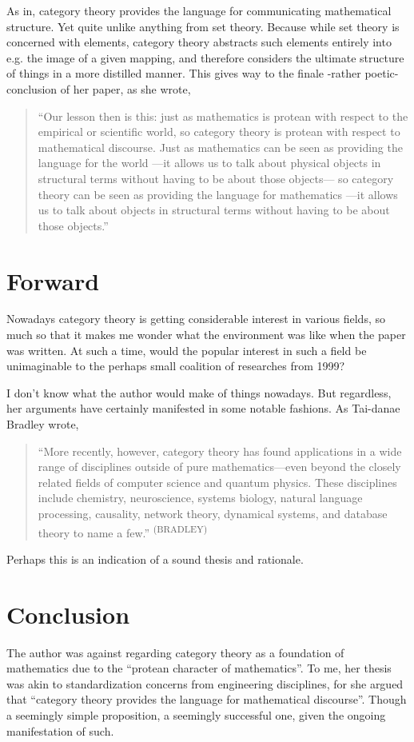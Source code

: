 As in, category theory provides the language for communicating mathematical structure. Yet quite unlike anything from set theory. Because while set theory is concerned with elements, category theory abstracts such elements entirely into e.g. the image of a given mapping, and therefore considers the ultimate structure of things in a more distilled manner. This gives way to the finale -rather poetic- conclusion of her paper, as she wrote,
\begin{quotation}
``Our lesson then is this: just as mathematics is protean with respect to the empirical or scientific world, so category theory is protean with respect to mathematical discourse. Just as mathematics can be seen as providing the language for the world —it allows us to talk about physical objects in structural terms without having to be about those objects— so category theory can be seen as providing the language for mathematics —it allows us to talk about objects in structural terms without having to be about those objects.''
\end{quotation}

\section*{Forward}

Nowadays category theory is getting considerable interest in various fields, so much so that it makes me wonder what the environment was like when the paper was written. At such a time, would the popular interest in such a field be unimaginable to the perhaps small coalition of researches from 1999?

I don’t know what the author would make of things nowadays. But regardless, her arguments have certainly manifested in some notable fashions. As Tai-danae Bradley wrote,
\begin{quotation}
``More recently, however, category theory has found applications in a wide range of disciplines outside of pure mathematics—even beyond the closely related fields of computer science and quantum physics. These disciplines include chemistry, neuroscience, systems biology, natural language processing, causality, network theory, dynamical systems, and database theory to name a few.'' \textsuperscript{(BRADLEY)}
\end{quotation}

Perhaps this is an indication of a sound thesis and rationale. 


\section*{Conclusion}

The author was against regarding category theory as a foundation of mathematics due to the ``protean character of mathematics''. To me, her thesis was akin to standardization concerns from engineering disciplines, for she argued that ``category theory provides the language for mathematical discourse''. Though a seemingly simple proposition, a seemingly successful one, given the ongoing manifestation of such.
